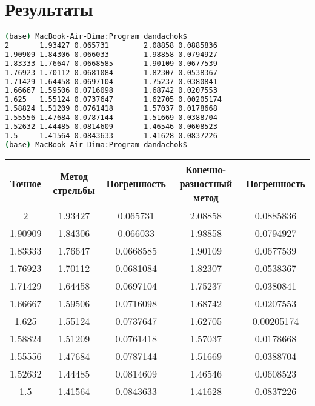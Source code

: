 \section*{Результаты}

\begin{lstlisting}[language=bash]
(base) MacBook-Air-Dima:Program dandachok$
2       1.93427 0.065731        2.08858 0.0885836
1.90909 1.84306 0.066033        1.98858 0.0794927
1.83333 1.76647 0.0668585       1.90109 0.0677539
1.76923 1.70112 0.0681084       1.82307 0.0538367
1.71429 1.64458 0.0697104       1.75237 0.0380841
1.66667 1.59506 0.0716098       1.68742 0.0207553
1.625   1.55124 0.0737647       1.62705 0.00205174
1.58824 1.51209 0.0761418       1.57037 0.0178668
1.55556 1.47684 0.0787144       1.51669 0.0388704
1.52632 1.44485 0.0814609       1.46546 0.0608523
1.5     1.41564 0.0843633       1.41628 0.0837226
(base) MacBook-Air-Dima:Program dandachok$ 
\end{lstlisting}

\begin{tabular}{ | c | c | c | c | c |}
\hline
Точное& Метод стрельбы & Погрешность & Конечно-разностный метод & Погрешность \\ 
\hline
2       & 1.93427 & 0.065731  & 2.08858 & 0.0885836 \\
1.90909 & 1.84306 & 0.066033  & 1.98858 & 0.0794927 \\
1.83333 & 1.76647 & 0.0668585 & 1.90109 & 0.0677539 \\
1.76923 & 1.70112 & 0.0681084 & 1.82307 & 0.0538367 \\
1.71429 & 1.64458 & 0.0697104 & 1.75237 & 0.0380841 \\
1.66667 & 1.59506 & 0.0716098 & 1.68742 & 0.0207553 \\
1.625   & 1.55124 & 0.0737647 & 1.62705 & 0.00205174 \\
1.58824 & 1.51209 & 0.0761418 & 1.57037 & 0.0178668 \\
1.55556 & 1.47684 & 0.0787144 & 1.51669 & 0.0388704 \\
1.52632 & 1.44485 & 0.0814609 & 1.46546 & 0.0608523 \\
1.5     & 1.41564 & 0.0843633 & 1.41628 & 0.0837226 \\
    \hline
\end{tabular}

\pagebreak